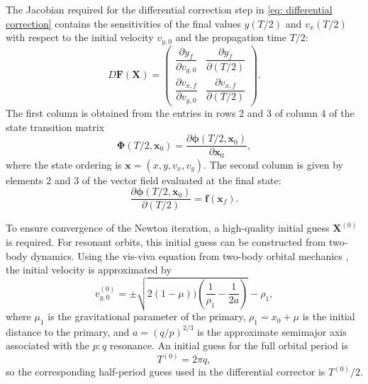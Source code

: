 The Jacobian required for the differential correction step in \cref{eq: differential correction} contains the sensitivities of the final values $y(T/2)$ and $v_x(T/2)$ with respect to the initial velocity $v_{y,0}$ and the propagation time $T/2$:
\begin{equation*}
    D\boldsymbol{F}(\boldsymbol{X})
    =
    \begin{pmatrix}
        \dfrac{\partial y_f}{\partial v_{y,0}}
        &
        \dfrac{\partial y_f}{\partial (T/2)}
        \\[1.2em]
        \dfrac{\partial v_{x,f}}{\partial v_{y,0}}
        &
        \dfrac{\partial v_{x,f}}{\partial (T/2)}
    \end{pmatrix}.
\end{equation*}
The first column is obtained from the entries in rows $2$ and $3$ of column $4$ of the state transition matrix
\begin{equation*}
    \boldsymbol{\Phi}(T/2,\boldsymbol{x}_0)
    =
    \frac{\partial \boldsymbol{\phi}(T/2,\boldsymbol{x}_0)}
    {\partial \boldsymbol{x}_0},
\end{equation*}
where the state ordering is $\boldsymbol{x}=(x,y,v_x,v_y)$. 
The second column is given by elements $2$ and $3$ of the vector field evaluated at the final state:
\begin{equation*}
    \frac{\partial \boldsymbol{\phi}(T/2,\boldsymbol{x}_0)}
    {\partial (T/2)}
    =
    \boldsymbol{f}(\boldsymbol{x}_f).
\end{equation*}

To ensure convergence of the Newton iteration, a high-quality initial guess $\boldsymbol{X}^{(0)}$ is required. 
For resonant orbits, this initial guess can be constructed from two-body dynamics. 
Using the vis-viva equation from two-body orbital mechanics \cite{Bate1971}, the initial velocity is approximated by
\begin{equation}
    v_{y,0}^{(0)}
    =
    \pm \sqrt{2(1-\mu)) \left( \frac{1}{\rho_1} - \frac{1}{2a} \right)} - \rho_1,
\end{equation}
where $\mu_1$ is the gravitational parameter of the primary, $\rho_1=x_0+\mu$ is the initial distance to the primary, and $a=(q/p)^{2/3}$ is the approximate semimajor axis associated with the $p:q$ resonance. 
An initial guess for the full orbital period is
\begin{equation*}
    T^{(0)} = 2\pi q,
\end{equation*}
so the corresponding half-period guess used in the differential corrector is $T^{(0)}/2$.


